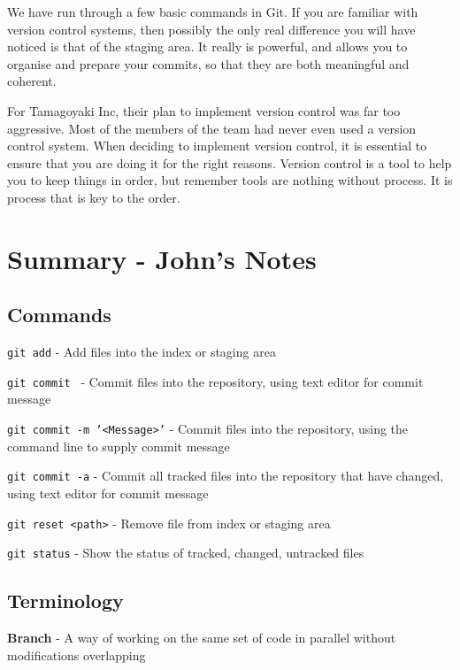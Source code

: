 We have run through a few basic commands in Git.  If you are familiar with version control systems, then possibly the only real difference you will have noticed is that of the staging area.  It really is powerful, and allows you to organise and prepare your commits, so that they are both meaningful and coherent.

For Tamagoyaki Inc, their plan to implement version control was far too aggressive.  Most of the members of the team had never even used a version control system.  When deciding to implement version control, it is essential to ensure that you are doing it for the right reasons.  Version control is a tool to help you to keep things in order, but remember tools are nothing without process.  It is process that is key to the order.

\section{Summary - John's Notes}
\subsection{Commands}
\texttt{git add} - Add files into the index or staging area

\texttt{git commit } - Commit files into the repository, using text editor for commit message

\texttt{git commit -m '<Message>'} - Commit files into the repository, using the command line to supply commit message

\texttt{git commit -a} - Commit all tracked files into the repository that have changed, using text editor for commit message

\texttt{git reset <path>} - Remove file from index or staging area

\texttt{git status} - Show the status of tracked, changed, untracked files
\subsection{Terminology}
\textbf{Branch} - A way of working on the same set of code in parallel without modifications overlapping
